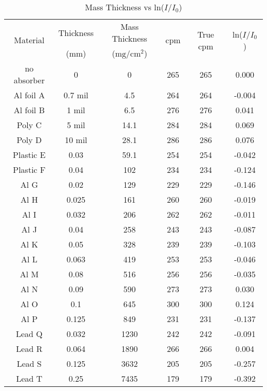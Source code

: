 \documentclass[11pt]{article}
\begin{document}
	\begin{table}[htbp]
		\centering
		\caption{Mass Thickness vs ln($I/I_0$)}
		\begin{tabular}{cccccc}
			\toprule
			\multirow{2}[4]{*}{Material} & Thickness & Mass Thickness & \multirow{2}[4]{*}{cpm} & \multirow{2}[4]{*}{True cpm} & \multirow{2}[4]{*}{ln($I/I_0$)} \\
			\cmidrule{2-3}      & ($\unit{\milli\meter}$) & ($\unit{\milli\gram\per\centi\meter\squared}$) &   &   &  \\
			\midrule
			no absorber & 0 & 0 & 265 & 265 & 0.000 \\
			Al foil A & 0.7 mil & 4.5 & 264 & 264 & -0.004 \\
			Al foil B & 1 mil & 6.5 & 276 & 276 & 0.041 \\
			Poly C & 5 mil & 14.1 & 284 & 284 & 0.069 \\
			Poly D & 10 mil & 28.1 & 286 & 286 & 0.076 \\
			Plastic E & 0.03 & 59.1 & 254 & 254 & -0.042 \\
			Plastic F & 0.04 & 102 & 234 & 234 & -0.124 \\
			Al G & 0.02 & 129 & 229 & 229 & -0.146 \\
			Al H & 0.025 & 161 & 260 & 260 & -0.019 \\
			Al I & 0.032 & 206 & 262 & 262 & -0.011 \\
			Al J & 0.04 & 258 & 243 & 243 & -0.087 \\
			Al K & 0.05 & 328 & 239 & 239 & -0.103 \\
			Al L & 0.063 & 419 & 253 & 253 & -0.046 \\
			Al M & 0.08 & 516 & 256 & 256 & -0.035 \\
			Al N & 0.09 & 590 & 273 & 273 & 0.030 \\
			Al O & 0.1 & 645 & 300 & 300 & 0.124 \\
			Al P & 0.125 & 849 & 231 & 231 & -0.137 \\
			Lead Q & 0.032 & 1230 & 242 & 242 & -0.091 \\
			Lead R & 0.064 & 1890 & 266 & 266 & 0.004 \\
			Lead S & 0.125 & 3632 & 205 & 205 & -0.257 \\
			Lead T & 0.25 & 7435 & 179 & 179 & -0.392 \\
			\bottomrule
		\end{tabular}%
		\label{tab:12_Table}%
	\end{table}%
	
\end{document}
